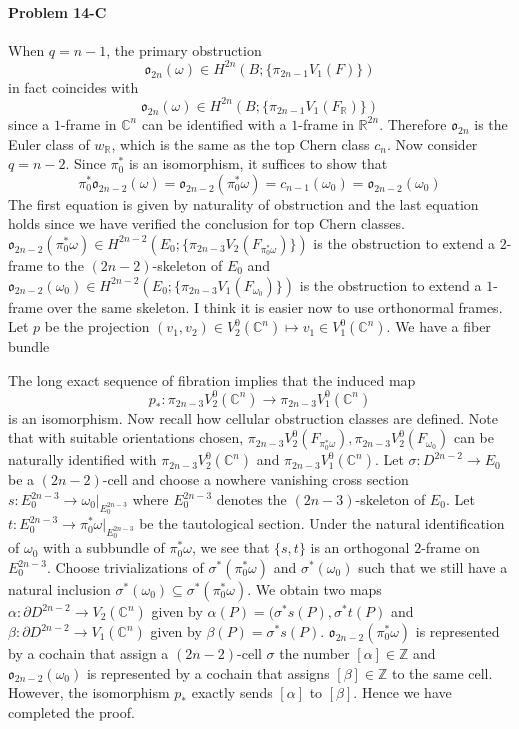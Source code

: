 \documentclass[12pt]{article}
\theoremstyle{plain}
\theoremstyle{definition}
\newcommand{\IC}{\mathbb{C}}
\newcommand{\IR}{\mathbb{R}}
\newcommand{\IS}{\mathbb{S}}
\newcommand{\IZ}{\mathbb{Z}}
\newcommand{\so}{\mathfrak{o}}
\newcommand{\<}{\langle}
\renewcommand{\>}{\rangle}
\newcommand{\p}{\partial}
\newcommand{\w}{\omega}
\begin{document}
\paragraph{Problem 14-C}
When $q = n - 1$, the primary obstruction 
$$ \so_{2n} (\w) \in H^{2n}(B; \{ \pi_{2n-1} V_1(F)\} ) $$ 
in fact coincides with 
$$ \so_{2n} (\w) \in H^{2n}(B; \{ \pi_{2n-1} V_1(F_\IR)\} ) $$ 
since a $1$-frame in $\IC^n$ can be identified with a $1$-frame in $\IR^{2n}$. Therefore $\so_{2n}$ is the Euler class of $w_\IR$, which is the same as the top Chern class $c_n$. Now consider $q = n - 2$. Since $\pi^*_0$ is an isomorphism, it suffices to show that 
$$ \pi_0^* \so_{2n - 2}(\w) = \so_{2n - 2}(\pi_0^* \w) = c_{n - 1}(\w_0) = \so_{2n - 2} (\w_0) $$
The first equation is given by naturality of obstruction and the last equation holds since we have verified the conclusion for top Chern classes. $\so_{2n - 2}(\pi_0^* \w) \in H^{2n - 2}(E_0; \{ \pi_{2n - 3} V_2(F_{\pi_0^* \w}) \})$ is the obstruction to extend a $2$-frame to the $(2n - 2)$-skeleton of $E_0$ and  $\so_{2n - 2}(\w_0) \in H^{2n - 2}(E_0; \{ \pi_{2n - 3} V_1(F_{\w_0}) \})$ is the obstruction to extend a $1$-frame over the same skeleton. I think it is easier now to use orthonormal frames. Let $p$ be the projection $(v_1, v_2) \in V_2^0(\IC^n) \mapsto v_1 \in V^0_1(\IC^n)$. We have a fiber bundle 
\begin{center}
\end{center}
The long exact sequence of fibration implies that 
the induced map $$p_* :  \pi_{2n - 3} V^0_2(\IC^n) \to \pi_{2n - 3} V^0_1(\IC^n) $$ is an isomorphism. 
Now recall how cellular obstruction classes are defined. Note that with suitable orientations chosen, $\pi_{2n - 3} V^0_2(F_{\pi_0^* \w}), \pi_{2n - 3} V^0_2(F_{\w_0})$ can be naturally identified with $\pi_{2n - 3} V^0_2(\IC^n)$ and $\pi_{2n - 3} V^0_1(\IC^n)$. Let $\sigma : D^{2n - 2} \to E_0$ be a $(2n - 2)$-cell and choose a nowhere vanishing cross section $s : E_0^{2n - 3} \to \w_0|_{E_0^{2n - 3}}$ where $E_0^{2n - 3}$ denotes the $(2n-3)$-skeleton of $E_0$. Let $t : E_0^{2n - 3} \to \pi_0^* \w|_{E_0^{2n - 3}}$ be the tautological section. Under the natural identification of $\w_0$ with a subbundle of $\pi_0^* \w$, we see that $\{s, t\}$ is an orthogonal $2$-frame on $E_0^{2n - 3}$. Choose trivializations of $\sigma^*(\pi_0^* \w)$ and $\sigma^*(\w_0)$ such that we still have a natural inclusion $ \sigma^*(\w_0) \subseteq \sigma^*(\pi_0^* \w)$. We obtain two maps $\alpha : \p D^{2n - 2} \to V_2(\IC^n)$ given by $\alpha(P) = (\sigma^* s(P), \sigma^* t(P)$ and $\beta : \p D^{2n - 2} \to V_1(\IC^n)$ given by $\beta(P) = \sigma^* s(P)$. $\so_{2n - 2}(\pi_0^* \w)$ is represented by a cochain that assign a $(2n - 2)$-cell $\sigma$ the number $[\alpha] \in \IZ$ and $\so_{2n - 2}(\w_0)$ is represented by a  cochain that assigns $[\beta] \in \IZ$ to the same cell. However, the isomorphism $p_*$ exactly sends $[\alpha]$ to $[\beta]$. Hence we have completed the proof. 
\end{document}
